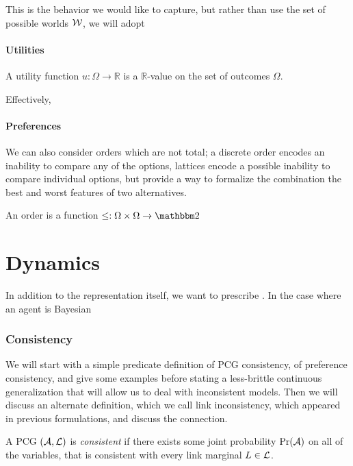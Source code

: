\documentclass{article}
\begin{document}
	This is the behavior we would like to capture, but rather than use the set of possible worlds $\cal W$, we will adopt 
	
	
	\subsection{Utilities}
	
		
	
	A utility function $u : \Omega \to \mathbb R$ is a $\mathbb R$-value on the set of outcomes $\Omega$. 
	
	Effectively, 

	
	\subsection{Preferences}
	We can also consider orders which are not total; a discrete order encodes an inability to compare any of the options, lattices encode a possible inability to compare individual options, but provide a way to formalize the combination the best and worst features of two alternatives.
	
	
	An order is a function $\leq: \Omega \times \Omega \to \mathbbm 2$
	
	\part{Dynamics}
	In addition to the representation itself, we want to prescribe . 
	In the case where an agent is Bayesian 
	
	\section{Consistency}
	\label{sec:inconsistency-ex}
	We will start with a simple predicate definition of PCG consistency, of preference consistency, and give some examples before stating a less-brittle continuous generalization that will allow us to deal with inconsistent models. Then we will discuss an alternate definition, which we call link inconsistency, which appeared in previous formulations, and discuss the connection.

	
	\begin{defn}[consistency]
		A PCG $(\cal A, L)$ is \emph{consistent} if there exists some joint probability $\Pr(\cal A)$ on all of the variables, that is consistent with every link marginal $L \in \cal L$.
	\end{defn}
\end{document}
